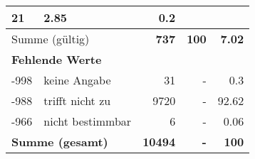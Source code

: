 \begin{longtable}{lXrrr}
       \num{21} &
       \num[round-mode=places,round-precision=2]{2,85} &
         \num[round-mode=places,round-precision=2]{0,2} \\
     \midrule
     \multicolumn{2}{l}{Summe (gültig)} &
       \textbf{\num{737}} &
     \textbf{100} &
       \textbf{\num[round-mode=places,round-precision=2]{7,02}} \\
     \multicolumn{5}{l}{\textbf{Fehlende Werte}}\\
       -998 &
       keine Angabe &
         \num{31} &
        - &
         \num[round-mode=places,round-precision=2]{0,3} \\
       -988 &
       trifft nicht zu &
         \num{9720} &
        - &
         \num[round-mode=places,round-precision=2]{92,62} \\
       -966 &
       nicht bestimmbar &
         \num{6} &
        - &
         \num[round-mode=places,round-precision=2]{0,06} \\
     \midrule
     \multicolumn{2}{l}{\textbf{Summe (gesamt)}} &
          \textbf{\num{10494}} &
        \textbf{-} &
        \textbf{100} \\
     \bottomrule
     \end{longtable}
     
